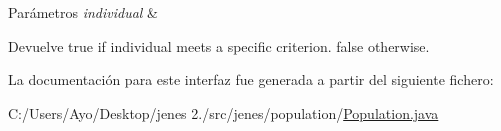 \begin{DoxyParams}{Parámetros}
{\em individual} & \\
\hline
\end{DoxyParams}
\begin{DoxyReturn}{Devuelve}
{\ttfamily true} if individual meets a specific criterion. {\ttfamily  false } otherwise. 
\end{DoxyReturn}


La documentación para este interfaz fue generada a partir del siguiente fichero\-:\begin{DoxyCompactItemize}
\item 
C\-:/\-Users/\-Ayo/\-Desktop/jenes 2./src/jenes/population/\hyperlink{_population_8java}{Population.\-java}\end{DoxyCompactItemize}
